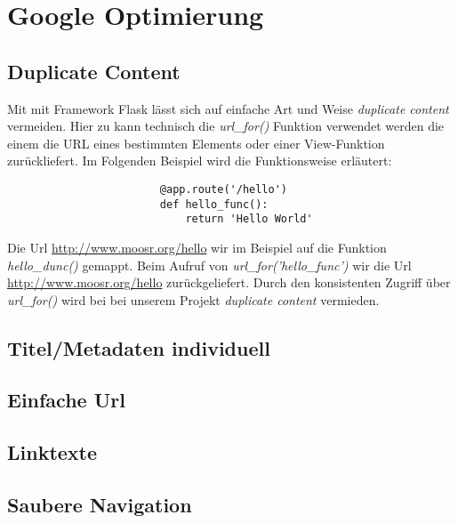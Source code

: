 
\chapter{Google Optimierung}
\section{Duplicate Content}
Mit mit Framework Flask lässt sich auf einfache Art und Weise \emph{duplicate
content} vermeiden. Hier zu kann technisch die \emph{url\_for()} Funktion
verwendet werden die einem die URL eines bestimmten Elements oder einer
View-Funktion zurückliefert. Im Folgenden Beispiel wird die Funktionsweise
erläutert:
\begin{verbatim}
                        @app.route('/hello')
                        def hello_func():
                            return 'Hello World'
\end{verbatim}

Die Url \url{http://www.moosr.org/hello} wir im Beispiel auf die Funktion
\emph{hello\_dunc()} gemappt. Beim Aufruf von \emph{url\_for('hello\_func')} wir
die Url \url{http://www.moosr.org/hello} zurückgeliefert. Durch den konsistenten
Zugriff über \emph{url\_for()} wird bei bei unserem Projekt
\emph{duplicate content} vermieden.


\section{Titel/Metadaten individuell}
\section{Einfache Url}
\section{Linktexte}
\section{Saubere Navigation}
